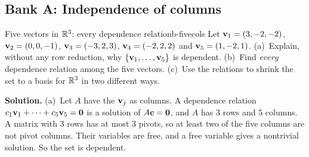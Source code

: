 \documentclass[11pt]{article}
\begin{document}
\subsection*{Bank A: Independence of columns}

\begin{exmp}{Five vectors in $\mathbb{R}^3$: every dependence relation}{b-fivecols}
Let $\mathbf{v}_1=(3,-2,-2)$, $\mathbf{v}_2=(0,0,-1)$, $\mathbf{v}_3=(-3,2,3)$, $\mathbf{v}_4=(-2,2,2)$ and $\mathbf{v}_5=(1,-2,1)$. (a)~Explain, without any row reduction, why $\{\mathbf{v}_1,\dots,\mathbf{v}_5\}$ is dependent. (b)~Find \emph{every} dependence relation among the five vectors. (c)~Use the relations to shrink the set to a basis for $\mathbb{R}^3$ in two different ways.

\textbf{Solution.} (a)~Let $A$ have the $\mathbf{v}_j$ as columns. A dependence relation $c_1\mathbf{v}_1+\cdots+c_5\mathbf{v}_5=\mathbf{0}$ is a solution of $A\mathbf{c}=\mathbf{0}$, and $A$ has $3$ rows and $5$ columns. A matrix with $3$ rows has at most $3$ pivots, so at least two of the five columns are not pivot columns. Their variables are free, and a free variable gives a nontrivial solution. So the set is dependent.


\end{exmp}
\end{document}
